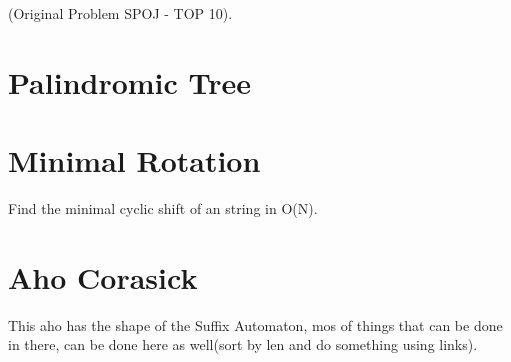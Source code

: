     (Original Problem SPOJ - TOP 10).
    
    \section{Palindromic Tree} 
    
    \section{Minimal Rotation}
    Find the minimal cyclic shift of an string in O(N).
    
    
    \section{Aho Corasick} 
    This aho has the shape of the Suffix Automaton, mos of things that can be done in there, can be done here as well(sort by len and do something using links).

    
    
    
    